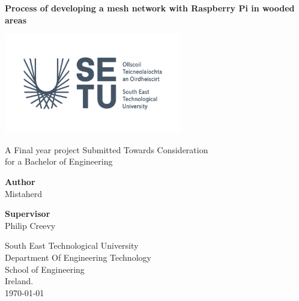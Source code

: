 \thispagestyle{empty}

\begin{center}
	\begin{LARGE}
		\textbf{Process of developing a mesh network with Raspberry Pi in wooded areas} \\
	
	\end{LARGE}

\vspace{40pt}

\begin{center}
	\includegraphics[width=220pt]{Images/SETU_Ireland_logo.png}
\end{center}

\vspace{50pt}

A Final year project Submitted Towards Consideration \\
for a Bachelor of Engineering \\

\vspace{60pt}

\textbf{Author} \\Mistaherd \\

\vspace{40pt}

\textbf{Supervisor} \\
Philip Creevy \\

\vspace{30pt}

South East Technological University \\
Department Of Engineering Technology \\
School of Engineering \\
Ireland. \\
\today
\end{center}

